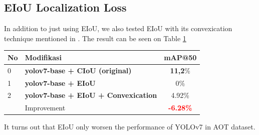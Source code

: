 \documentclass[conference]{IEEEtran}
\begin{document}
\subsection{EIoU Localization Loss}
In addition to just using EIoU, we also tested EIoU with its convexication technique 
mentioned in \cite{eiou}. The result can be seen on Table \ref{tbl:loss_function_perf}
\begin{table}[htbp]
  \centering
  \label{tbl:loss_function_perf}
  \vspace{-1ex}
  \begin{tabular}{ l l c }
    \toprule[1.5pt]
    No & Modifikasi        &mAP@50 \\
    \midrule
    0  & \textbf{yolov7-base + CIoU (original)}     & \textbf{11,2}\%\\
    1  & \textbf{yolov7-base + EIoU}                & 0\%\\
    2  & \textbf{yolov7-base + EIoU + Convexication} & 4.92\%\\
    \midrule
       & Improvement                                & \textbf{\textcolor{red}{-6.28\%}}\\
    \bottomrule[1.5pt]
  \end{tabular}
\end{table}
It turns out that EIoU only worsen the performance of YOLOv7 in AOT dataset.
\end{document}
